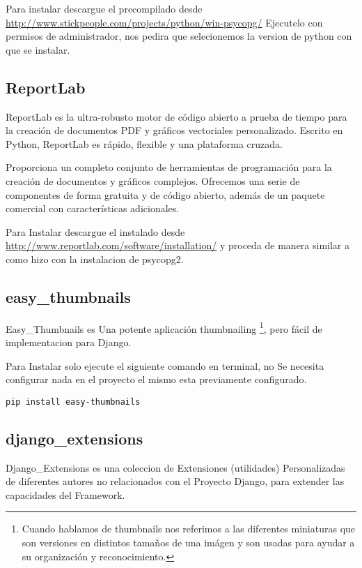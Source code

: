 Para instalar descargue el precompilado desde \url{http://www.stickpeople.com/projects/python/win-psycopg/}
Ejecutelo con permisos de administrador, nos pedira que selecionemos la version
de python con que se instalar.

\subsection{ReportLab}

ReportLab es la ultra-robusto motor de código abierto a prueba de tiempo para
la creación de documentos PDF y gráficos vectoriales personalizado. Escrito en
Python, ReportLab es rápido, flexible y una plataforma cruzada.
 
Proporciona un completo conjunto de herramientas de programación para la
creación de documentos y gráficos complejos. Ofrecemos una serie de componentes
 de forma gratuita y de código abierto, además de un paquete comercial con
características adicionales.

Para Instalar descargue el instalado desde \url{http://www.reportlab.com/software/installation/}
y proceda de manera similar a como hizo con la instalacion de psycopg2.


\subsection{easy\_thumbnails}

Easy\_Thumbnails es Una potente aplicación thumbnailing \footnote{Cuando hablamos de thumbnails 
nos referimos a las diferentes miniaturas que son versiones en distintos tamaños
 de una imágen y son usadas para ayudar a su organización y reconocimiento.},
pero fácil de implementacion para Django.

Para Instalar solo ejecute el siguiente comando en terminal, no Se necesita
configurar nada en el proyecto el mismo esta previamente configurado.

\begin{lstlisting}[style=consola]
    pip install easy-thumbnails
\end{lstlisting}
\vspace{0.1cm}

\subsection{django\_extensions}

Django\_Extensions es una coleccion de Extensiones (utilidades) Personalizadas de
diferentes autores no relacionados con el Proyecto Django, para extender las
capacidades del Framework.

